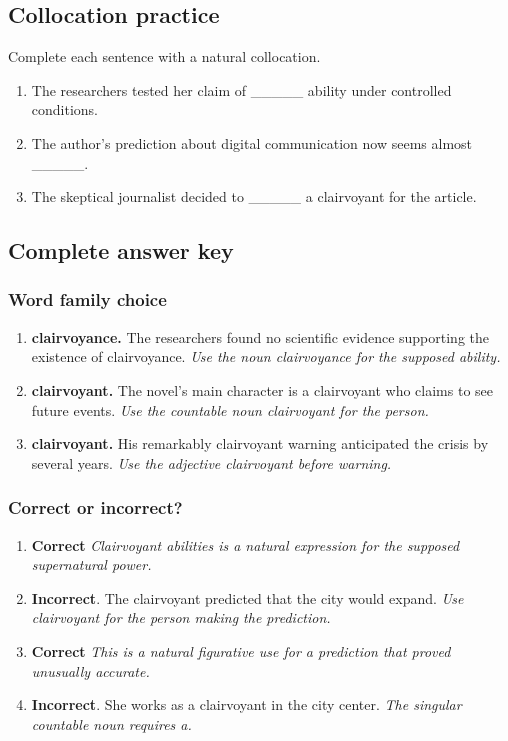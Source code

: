 \documentclass[11pt]{article}
\begin{document}
\subsection{Collocation practice}
Complete each sentence with a natural collocation.

\begin{enumerate}
  \item The researchers tested her claim of \_\_\_\_\_ ability under controlled conditions.
  \item The author's prediction about digital communication now seems almost \_\_\_\_\_.
  \item The skeptical journalist decided to \_\_\_\_\_ a clairvoyant for the article.
\end{enumerate}

\subsection{Complete answer key}
\subsubsection{Word family choice}
\begin{enumerate}
  \item \textbf{clairvoyance.} The researchers found no scientific evidence supporting the existence of clairvoyance. \emph{Use the noun clairvoyance for the supposed ability.}
  \item \textbf{clairvoyant.} The novel's main character is a clairvoyant who claims to see future events. \emph{Use the countable noun clairvoyant for the person.}
  \item \textbf{clairvoyant.} His remarkably clairvoyant warning anticipated the crisis by several years. \emph{Use the adjective clairvoyant before warning.}
\end{enumerate}

\subsubsection{Correct or incorrect?}
\begin{enumerate}
  \item \textbf{Correct} \emph{Clairvoyant abilities is a natural expression for the supposed supernatural power.}
  \item \textbf{Incorrect}. The clairvoyant predicted that the city would expand. \emph{Use clairvoyant for the person making the prediction.}
  \item \textbf{Correct} \emph{This is a natural figurative use for a prediction that proved unusually accurate.}
  \item \textbf{Incorrect}. She works as a clairvoyant in the city center. \emph{The singular countable noun requires a.}
\end{enumerate}
\end{document}
